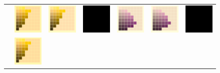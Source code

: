 \begin{figure}[t]
{\begin{tabular}{ccccccc}
			&\includegraphics[width=.155\linewidth]{img/results_uplift_page11_originalFL11.png}
			&
			\includegraphics[width=.155\linewidth]{img/results_uplift_page11_sigmoidFL11.png}
			& 
			\includegraphics[width=.155\linewidth]{img/toDelete.png}
			&\quad
			\includegraphics[width=.155\linewidth]{img/results_uplift_page35_originalD50.png}
			&
			\includegraphics[width=.155\linewidth]{img/results_uplift_page35_sigmoidD50.png}
			&
			\includegraphics[width=.155\linewidth]{img/toDelete.png}
			\\ \raisebox{0.5cm}[0pt][0pt]{\parbox[c][0pt][c]{0cm}{\hspace{-1.5em}\\[20pt]}\par}
			&
			\includegraphics[width=.155\linewidth]{img/results_uplift_page11_originalFL11.png}

\end{tabular}}
\end{figure}
